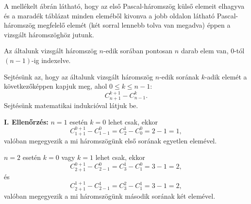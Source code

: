\begin{solution}
A mellékelt ábrán látható, hogy az első Pascal-háromszög külső elemeit
elhagyva és a maradék táblázat minden eleméből kivonva a jobb oldalon
látható Pascal-háromszög megfelelő elemét (két sorral lennebb tolva
van megadva) éppen a vizsgált háromszöghöz jutunk. 
\begin{center}
\par\end{center}
Az általunk vizsgált háromszög $n$-edik sorában pontosan $n$ darab
elem van, $0$-tól $(n-1)$-ig indexelve.

Sejtésünk az, hogy az általunk vizsgált háromszög $n$-edik sorának
$k$-adik elemét a következőképpen kapjuk meg, ahol $0\leq k\leq n-1$:
\[
C_{n+1}^{k+1}-C_{n-1}^{k}.
\]
Sejtésünk matematikai indukcióval látjuk be.

\textbf{I. Ellenőrzés:} $n=1$ esetén $k=0$ lehet csak, ekkor 
\[
C_{1+1}^{0+1}-C_{1-1}^{0}=C_{2}^{1}-C_{0}^{0}=2-1=1,
\]
valóban megegyezik a mi háromszögünk első sorának egyetlen elemével.

$n=2$ esetén $k=0$ vagy $k=1$ lehet csak, ekkor 
\[
C_{2+1}^{0+1}-C_{2-1}^{0}=C_{3}^{1}-C_{1}^{0}=3-1=2,
\]
és 
\[
C_{2+1}^{1+1}-C_{2-1}^{1}=C_{3}^{2}-C_{1}^{1}=3-1=2,
\]
valóban megegyezik a mi háromszögünk második sorának két elemével.


\end{solution}
